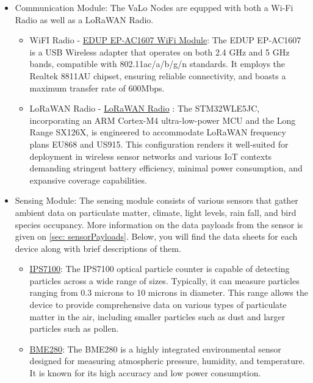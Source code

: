 \documentclass[12pt]{article}
\begin{document}
\begin{itemize}
    \item Communication Module: 
        The VaLo Nodes are equpped with both a Wi-Fi Radio as well as a LoRaWAN Radio. 
        \begin{itemize}
            \item WiFI Radio - \href{https://ameridroid.com/products/edup-ep-ac1607-wifi-module?_pos=3&_sid=46b124f43&_ss=r}{EDUP EP-AC1607 WiFi Module}: 
            The EDUP EP-AC1607 is a USB Wireless adapter that operates on both 2.4 GHz and 5 GHz bands, compatible with 802.11ac/a/b/g/n standards. It employs the Realtek 8811AU chipset, ensuring reliable connectivity, and boasts a maximum transfer rate of 600Mbps.
            \item LoRaWAN Radio - \href{https://www.seeedstudio.com/LoRa-E5-Wireless-Module-p-4745.html?gad_source=1&gclid=Cj0KCQjwxeyxBhC7ARIsAC7dS3-qwDDoYHPQ9hP4t4SFxPsY7ys7Z9Dv67dw1kYCiV2LP2-xPh-JNXMaAny5EALw_wcB}{LoRaWAN Radio} :
            The STM32WLE5JC, incorporating an ARM Cortex-M4 ultra-low-power MCU and the Long Range SX126X, is engineered to accommodate LoRaWAN frequency plans EU868 and US915. This configuration renders it well-suited for deployment in wireless sensor networks and various IoT contexts demanding stringent battery efficiency, minimal power consumption, and expansive coverage capabilities.
        \end{itemize} 
        
        \item Sensing Module: The sensing module consists of various sensors that gather ambient data on particulate matter, climate, light levels, rain fall, and bird species occupancy. More information on the data payloads from the sensor is given on \ref{sec: sensorPayloads}. 
        Below, you will find the data sheets for each device along with brief descriptions of them.
    
    \begin{itemize}
        \item \href{https://pierasystems.com/wp-content/uploads/2021/12/IPS-Datasheet-V1.1.8.pdf}{IPS7100}: The IPS7100 optical particle counter is capable of detecting particles across a wide range of sizes. Typically, it can measure particles ranging from 0.3 microns to 10 microns in diameter. This range allows the device to provide comprehensive data on various types of particulate matter in the air, including smaller particles such as dust and larger particles such as pollen.
        \item \href{https://www.bosch-sensortec.com/media/boschsensortec/downloads/datasheets/bst-bme280-ds002.pdf}{BME280}:
        The BME280 is a highly integrated environmental sensor designed for measuring atmospheric pressure, humidity, and temperature. It is known for its high accuracy and low power consumption.
        

\end{itemize}
\end{itemize}
\end{document}

